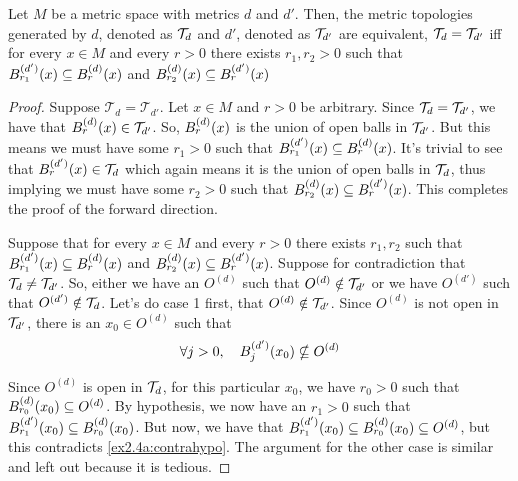 \documentclass{article}
\begin{document}
\begin{theorem}
\label{thm:ex2.4a}
Let $M$ be a metric space with metrics $d$ and $d'$. Then, the metric topologies 
generated by $d$, denoted as $\mathcal{T}_d$ and $d'$, denoted as $\mathcal{T}_{d'}$
are equivalent, $\mathcal{T}_d = \mathcal{T}_{d'}$ iff for every $x \in M$ and every $r > 0$
there exists $r_1, r_2 > 0$ such that $ B_{r_1}^{(d')} (x)  \subseteq  B_{r}^{(d)} (x) $ and
$ B_{r_2}^{(d)} (x)  \subseteq  B_{r}^{(d')} (x) $
\end{theorem}
\begin{proof}
\forwarddir Suppose $\mathcal{T}_d = \mathcal{T}_{d'}$. Let $x \in M$ and $r > 0$ be arbitrary.
Since $\mathcal{T}_d = \mathcal{T}_{d'}$, we have that $ B_{r}^{(d)} (x)  \in \mathcal{T}_{d'}$. So, $ B_{r}^{(d)} (x) $
is the union of open balls in $\mathcal{T}_{d'}$. But this means we must have some $r_1 > 0$ such that $ B_{r_1}^{(d')} (x)  \subseteq  B_{r}^{(d)} (x) $. It's trivial to see that
$ B_{r}^{(d')} (x)  \in \mathcal{T}_d$ which again means it is the union of open balls in $\mathcal{T}_d$,
thus implying we must have some $r_2 > 0$ such that $ B_{r_2}^{(d)} (x)  \subseteq  B_{r}^{(d')} (x) $. 
 This completes the proof of the forward direction.


\conversedir  Suppose that for every $x \in M$ and every $r > 0$
there exists $r_1, r_2$ such that $ B_{r_1}^{(d')} (x)  \subseteq  B_{r}^{(d)} (x) $ and
$ B_{r_2}^{(d)} (x)  \subseteq  B_{r}^{(d')} (x) $. Suppose for contradiction that $\mathcal{T}_d \neq \mathcal{T}_{d'}$. So, either we have an $O^{(d)}$ such that $O^{(d)} \notin \mathcal{T}_{d'}$ or we have
$O^{(d')}$ such that $O^{(d')} \notin \mathcal{T}_d$. Let's do case 1 first, that $O^{(d)} \notin \mathcal{T}_{d'}$. 
Since $O^{(d)}$ is not open in $\mathcal{T}_{d'}$, there is an $x_0 \in O^{(d)}$ such that 
\begin{align}
\label{ex2.4a:contrahypo}
    \forall j > 0, \quad  B_{j}^{(d')} (x_0)  \nsubseteq O^{(d)}
\end{align}


Since $O^{(d)}$ is open in $\mathcal{T}_d$, for this particular $x_0$, we have $r_0 > 0$ such that $ B_{r_0}^{(d)} (x_0)  \subseteq O^{(d)}$. 
By hypothesis, we now have an $r_1 > 0$ such that $ B_{r_1}^{(d')} (x_0)  \subseteq  B_{r_0}^{(d)} (x_0) $.
But now, we have that $ B_{r_1}^{(d')} (x_0)  \subseteq  B_{r_0}^{(d)} (x_0)  \subseteq O^{(d)}$, but this contradicts \cref{ex2.4a:contrahypo}. The argument for the other case is similar 
and left out because it is tedious.
\end{proof}
\end{document}
